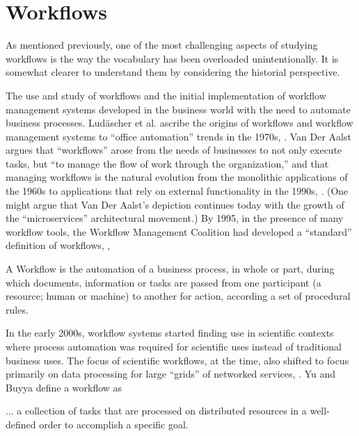 \section{Workflows}\label{workflows}

As mentioned previously, one of the most challenging aspects of studying
workflows is the way the vocabulary has been overloaded unintentionally.
It is somewhat clearer to understand them by considering the historial
perspective.

The use and study of workflows and the initial implementation of
workflow management systems developed in the business world with the
need to automate business processes. Lud\"{a}scher et al. ascribe the
origins of workflows and workflow management systems to ``office
automation'' trends in the 1970s, \cite{ludascher_scientific_2006}. Van Der
Aalst argues that ``workflows'' arose from the needs of businesses to not only
execute tasks, but ``to manage the flow of work through the
organization,'' and that managing workflows is the natural evolution
from the monolithic applications of the 1960s to applications that rely
on external functionality in the 1990s, \cite{van_der_aalst_application_1998}.
(One might argue that Van Der Aalst's depiction continues today with the
growth of the ``microservices'' architectural movement.) By 1995, in the
presence of many workflow tools, the Workflow Management Coalition had developed a ``standard'' definition of
workflows, \cite{hollingsworth_workflow_1993},

\begin{displayquote}
A Workflow is the automation of a business process, in whole or part, during
which documents, information or tasks are passed from one participant (a 
resource; human or machine) to another for action, according a set of 
procedural rules. 
\end{displayquote}

In the early 2000s, workflow systems started finding use in scientific
contexts where process automation was required for scientific uses
instead of traditional business uses. The focus of scientific workflows,
at the time, also shifted to focus primarily on data processing for
large ``grids'' of networked services, \cite{yu_taxonomy_2005}. Yu and Buyya
define a workflow as

\begin{displayquote}
... a collection of tasks that are processed on distributed resources in a
well-defined order to accomplish a specific goal.
\end{displayquote}


